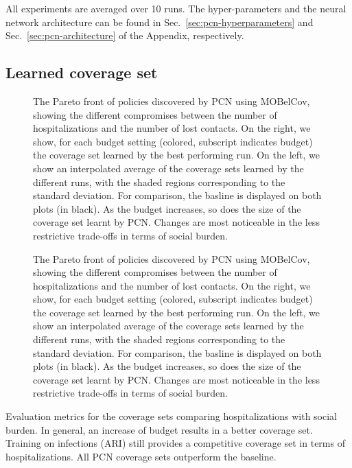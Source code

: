 \documentclass{article}
\newcommand{\momdpname}{MOBelCov}
\begin{document}
All experiments are averaged over 10 runs. The hyper-parameters and the neural network architecture can be found in Sec.~\ref{sec:pcn-hyperparameters} and Sec.~\ref{sec:pcn-architecture} of the Appendix, respectively.


\subsection{Learned coverage set}

\begin{figure}
    \centering
    
    \caption{The Pareto front of policies discovered by PCN using \momdpname, showing the different compromises between the number of hospitalizations and the number of lost contacts. On the right, we show, for each budget setting (colored, subscript indicates budget) the coverage set learned by the best performing run. On the left, we show an interpolated average of the coverage sets learned by the different runs, with the shaded regions corresponding to the standard deviation. For comparison, the basline is displayed on both plots (in black). As the budget increases, so does the size of the coverage set learnt by PCN. Changes are most noticeable in the less restrictive trade-offs in terms of social burden.}
    \label{fig:pf-binomial-arh-budgets}
\end{figure}


\begin{figure}
    \centering
    
    \caption{The Pareto front of policies discovered by PCN using \momdpname, showing the different compromises between the number of hospitalizations and the number of lost contacts. On the right, we show, for each budget setting (colored, subscript indicates budget) the coverage set learned by the best performing run. On the left, we show an interpolated average of the coverage sets learned by the different runs, with the shaded regions corresponding to the standard deviation. For comparison, the basline is displayed on both plots (in black). As the budget increases, so does the size of the coverage set learnt by PCN. Changes are most noticeable in the less restrictive trade-offs in terms of social burden.}
    \label{fig:pf-binomial-arh-budgets}
\end{figure}

\begin{table}[t]
    \centering
    \setlength{\tabcolsep}{0.5em} %
    {\renewcommand{\arraystretch}{1.2}%
    
    }
    \caption{Evaluation metrics for the coverage sets comparing hospitalizations with social burden. In general, an increase of budget results in a better coverage set. Training on infections (ARI) still provides a competitive coverage set in terms of hospitalizations. All PCN coverage sets outperform the baseline.}
    \label{tab:coverage-set}
  \end{table}
\end{document}
